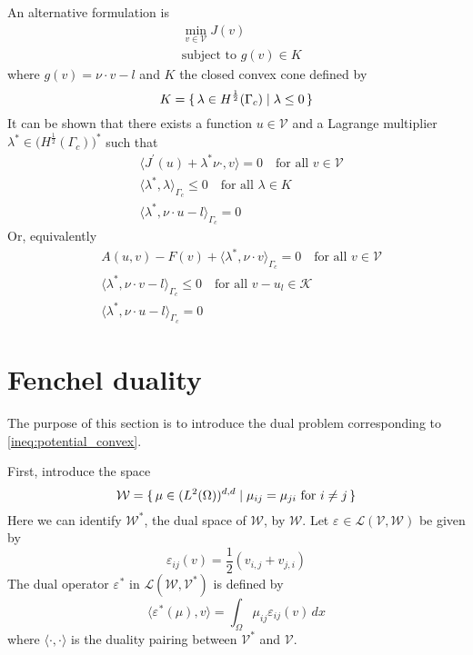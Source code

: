 \documentclass[12pt,a4paper]{article}
\numberwithin{equation}{section}
\numberwithin{table}{section}
\numberwithin{figure}{section}
\newcommand{\W}{\ensuremath{\mathcal{W}}}
\newcommand{\half}{\ensuremath{\frac{1}{2}}}
\newcommand{\V}{\ensuremath{\mathcal{V}}}
\newcommand{\K}{\ensuremath{\mathcal{K}}}
\renewcommand{\L}{{\mathcal L}}
\newcommand{\intO}{\int_\Omega\!\!}
\renewcommand{\epsilon}{\varepsilon}
\newcommand{\strain}[1][]{\ensuremath{\epsilon_{#1}}}
\newcommand{\epsij}{\strain[ij]}
\providecommand{\dualp}[2]{\langle #1, #2 \rangle}
\newcommand{\dx}{{\,dx}}
\begin{document}
An alternative formulation is
\begin{equation}
  \begin{split}
    &\min_{v\in\V} J(v) \\
    &\text{subject to $g(v) \in K$}
  \end{split}
\end{equation}
where $g(v) = \nu\cdot v - l$ and $K$ the closed convex cone defined by
\begin{equation}
  K = \set{\lambda \in H^\half(\Gamma_c) | \lambda \le 0}
\end{equation}
It can be shown that there exists a function $u\in\V$ and a Lagrange multiplier
$\lambda^* \in \bigl(H^{\half}(\Gamma_c)\bigr)^*$ such that
\begin{align}
  &\dualp{J^\prime(u) + \lambda^* \nu\cdot}{v} = 0 \quad\text{for all $v\in \V$} \\
  &\dualp{\lambda^*}{\lambda}_{\Gamma_c} \le 0 \quad\text{for all $\lambda\in K$} \\
  &\dualp{\lambda^*}{\nu\cdot u - l}_{\Gamma_c} = 0
\end{align}
Or, equivalently
\begin{align}
  & A(u,v) - F(v) + \dualp{\lambda^*}{\nu\cdot v}_{\Gamma_c} = 0
  \quad\text{for all $v\in \V$} \\
  &\dualp{\lambda^*}{\nu\cdot v - l}_{\Gamma_c} \le 0 \quad\text{for all $v-u_l\in \K$} \\
  &\dualp{\lambda^*}{\nu\cdot u - l}_{\Gamma_c} = 0
\end{align}


\section{Fenchel duality}

The purpose of this section is to introduce the dual problem corresponding to \eqref{ineq:potential_convex}.

First, introduce the space
\begin{equation}
  \W = \set{\mu \in (L^2(\Omega))^{d,d} | \mu_{ij} = \mu_{ji}
    \text{ for } i\ne j } 
\end{equation}
Here we can identify $\W^*$, the dual space of $\W$, by $\W$.  Let $\strain \in \L(\V,\W)$
be given by
\begin{equation}
  \epsij(v) = \half (v_{i,j} + v_{j,i})
\end{equation}
The dual operator
$\strain^*$ in $\L(\W,\V^*)$ is defined by
\begin{equation}
  \dualp{\strain^*(\mu)}{v} = \intO \mu_{ij} \epsij(v) \dx
\end{equation}
where $\dualp{\cdot}{\cdot}$ is the duality pairing between $\V^*$ and
$\V$.  
\end{document}
